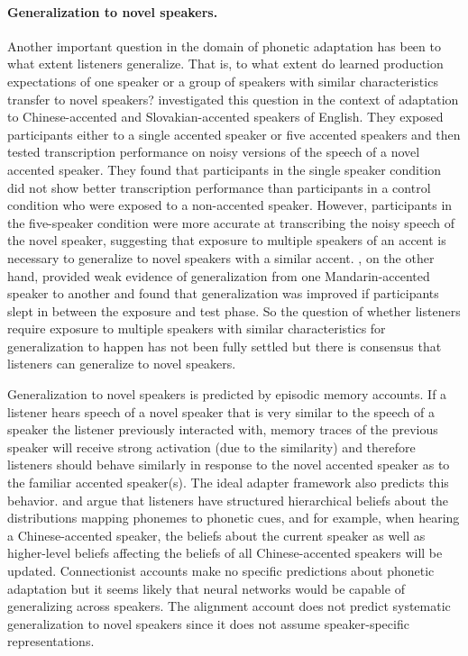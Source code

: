 \paragraph{Generalization to novel speakers.}  Another important question in the domain of phonetic adaptation has been
to what extent listeners generalize. That is, to what extent do learned production expectations of one speaker or a group of speakers with similar 
characteristics transfer to novel speakers? \textcite{Bradlow2008} investigated this question in the context of adaptation to Chinese-accented and Slovakian-accented
speakers of English. They exposed participants either to a single accented speaker or five accented speakers and then tested
transcription performance on noisy versions of the speech of a novel accented speaker. They found that participants in the single speaker condition
did not show better transcription performance than participants in a control condition who were exposed to a non-accented speaker. However, participants
in the five-speaker condition were more accurate at transcribing the noisy speech of the novel speaker, suggesting that exposure to multiple speakers of an accent is necessary
to generalize to novel speakers with a similar accent. \textcite{Xie2018}, on the other hand, provided weak evidence of generalization from one Mandarin-accented speaker 
to another and found that generalization was improved if participants slept in between the exposure and test phase. So the question of whether listeners require 
exposure to multiple speakers with similar characteristics for generalization to happen has not been fully settled but there is consensus that listeners can generalize to novel speakers.

Generalization to novel speakers is predicted by episodic memory accounts. If a listener hears speech of a novel speaker that is very similar to the speech of a speaker the listener previously interacted with, 
memory traces of the previous speaker will receive strong activation (due to the similarity) and therefore listeners should behave similarly in response to the 
novel accented speaker as to the familiar accented speaker(s). The ideal adapter framework also predicts this behavior. \textcite{Kleinschmidt2015} and \textcite{Kleinschmidt2019} 
argue that listeners have structured hierarchical beliefs about the distributions mapping phonemes to phonetic cues, and for example, when hearing a Chinese-accented speaker, 
the beliefs about the current speaker as well as higher-level beliefs affecting the beliefs of all Chinese-accented speakers will be updated. Connectionist accounts make no specific predictions
about phonetic adaptation but it seems likely that neural networks would be capable of generalizing across speakers. The alignment account does not predict systematic
generalization to novel speakers since it does not assume speaker-specific representations.

